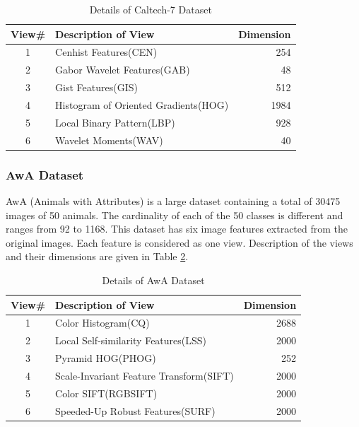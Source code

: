 \begin{table}[h]
	\centering
	\caption{Details of Caltech-7 Dataset}
	\label{tab:Caltech}
	\begin{tabular}{c l r} \toprule
		
		\textbf{View\#} & \textbf{Description of View} & \textbf{Dimension} \\ \midrule
		1 & Cenhist Features(CEN) & 254 \\ 
		2 & Gabor Wavelet Features(GAB) & 48 \\ 
		3 & Gist Features(GIS) & 512 \\ 
		4 & Histogram of Oriented Gradients(HOG) & 1984 \\ 
		5 & Local Binary Pattern(LBP) & 928 \\ 
		6 & Wavelet Moments(WAV) & 40 \\ \bottomrule
			
	\end{tabular}
\end{table}




\subsubsection{AwA Dataset}
\hspace{0.8cm}AwA (Animals with Attributes) is a large dataset \cite{LampertNH09} containing a total of 30475 images of 50 animals. The cardinality of each of the 50 classes is different and ranges from 92 to 1168. This dataset has six image features extracted from the original images. Each feature is considered as one view. Description of the views and their dimensions are given in Table \ref{tab:AwA}.

\begin{table}[h]
	\centering
	\caption{Details of AwA Dataset}
	\label{tab:AwA}
	\begin{tabular}{c l r} \toprule
		
		\textbf{View\#} & \textbf{Description of View} & \textbf{Dimension} \\ \midrule
		1 & Color Histogram(CQ) & 2688 \\ 
		2 & Local Self-similarity Features(LSS) & 2000 \\ 
		3 & Pyramid HOG(PHOG) & 252 \\ 
		4 & Scale-Invariant Feature Transform(SIFT) & 2000 \\ 
		5 & Color SIFT(RGBSIFT) & 2000 \\ 
		6 & Speeded-Up Robust Features(SURF) & 2000 \\ \bottomrule
			
	\end{tabular}
\end{table}







